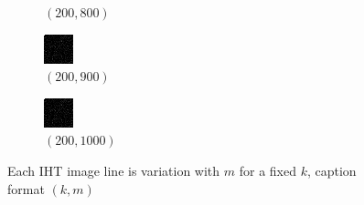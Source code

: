 \documentclass[a4paper, landscape]{article}
\begin{document}
\begin{figure}[H]
\begin{subfigure}{0.07\linewidth}
        \caption*{$(200, 800)$}
    \end{subfigure}
    \begin{subfigure}{0.07\linewidth}
        \centering
        \includegraphics[width=\linewidth]{iht/k = 200, m = 900.png}
        \caption*{$(200, 900)$}
    \end{subfigure}
    \begin{subfigure}{0.07\linewidth}
        \centering
        \includegraphics[width=\linewidth]{iht/k = 200, m = 1000.png}
        \caption*{$(200, 1000)$}
    \end{subfigure}
    \caption{Each IHT image line is variation with $m$ for a fixed $k$, caption format $(k, m)$}
    \label{fig:ik}
\end{figure}
\end{document}
